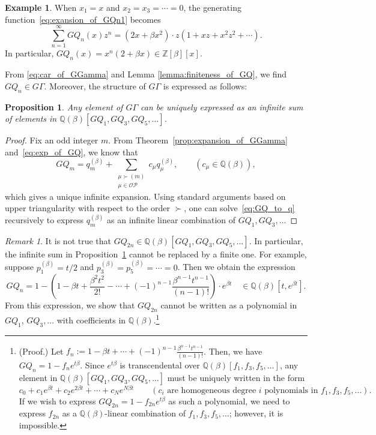 \documentclass[dvipdfmx]{amsart}
\newtheorem{prop}[thm]{Proposition}
\theoremstyle{definition}
\newtheorem{exa}[thm]{Example}%
\theoremstyle{remark}
\newtheorem*{remark}{Remark}%
\def\QQ{\mathord{\mathbb{Q}}}
\begin{document}
\begin{exa}
When \( x_1 = x \) and \( x_2 = x_3 = \cdots = 0 \), the generating function~\eqref{eq:exansion_of_GQn1} becomes
\[
\sum_{n = 1}^\infty GQ_n(x) z^n = 
(2x + \beta x^2) \cdot z(1 + xz + x^2 z^2 + \cdots).
\]
In particular, \( GQ_n(x) = x^n (2 + \beta x) \in \mathbb{Z}[\beta][x] \).
\end{exa}

From \eqref{eq:car_of_GGamma} and Lemma \ref{lemma:finiteness_of_GQ}, we find $GQ_n\in G\Gamma$.
Moreover, the structure of $G\Gamma$ is expressed as follows:

\begin{prop}\label{prop:exp_of_GGamma_in_GQ}
Any element of \( G\Gamma \) can be uniquely expressed as an infinite sum of elements in \( \mathbb{Q}(\beta)[GQ_1, GQ_3, GQ_5, \dots] \).
\end{prop}

\begin{proof}
Fix an odd integer \( m \). From Theorem~\ref{prop:expansion_of_GGamma} and~\eqref{eq:exp_of_GQ}, we know that
\begin{equation}\label{eq:GQ_to_q}
GQ_m = q_m^{(\beta)} + \sum_{\substack{\mu \succ (m) \\ \mu \in \mathcal{OP}}} c_\mu q_\mu^{(\beta)}, \qquad (c_\mu \in \mathbb{Q}(\beta)),
\end{equation}
which gives a unique infinite expansion. Using standard arguments based on upper triangularity with respect to the order \( \succ \), one can solve~\eqref{eq:GQ_to_q} recursively to express \( q_m^{(\beta)} \) as an infinite linear combination of \( GQ_1, GQ_3, \dots \)
\end{proof}

\begin{remark}
It is not true that \( GQ_{2n} \in \mathbb{Q}(\beta)[GQ_1, GQ_3, GQ_5, \dots] \).  
In particular, the infinite sum in Proposition~\ref{prop:exp_of_GGamma_in_GQ} cannot be replaced by a finite one.
For example, suppose \( p_1^{(\beta)} = t/2 \) and \( p_3^{(\beta)} = p_5^{(\beta)} = \cdots = 0 \).  
Then we obtain the expression
\[
GQ_n = 1 -
\left(1 - \beta t + \frac{\beta^2 t^2}{2!} - \cdots + (-1)^{n-1} \frac{\beta^{n-1} t^{n-1}}{(n-1)!} \right)
\cdot e^{\beta t} 
\quad \in \mathbb{Q}(\beta)[t, e^{\beta t}].
\]
From this expression, we show that \( GQ_{2n} \) cannot be written as a polynomial in $ GQ_1$, $GQ_3, \dots $ with coefficients in \( \mathbb{Q}(\beta) \).\footnote{
(Proof.) Let \( f_n := 1 - \beta t + \cdots + (-1)^{n-1} \frac{\beta^{n-1} t^{n-1}}{(n-1)!} \).  
Then, we have $GQ_n=1-f_ne^{t\beta}$.
Since $e^{t\beta}$ is transcendental over $\QQ(\beta)[f_1,f_3,f_5,\dots]$, any element in \( \mathbb{Q}(\beta)[GQ_1, GQ_3, GQ_5, \dots] \) must be uniquely written in the form
\[
c_0 + c_1 e^{\beta t} + c_2 e^{2\beta t} + \cdots + c_N e^{N \beta t}
\qquad
(c_i \text{ are homogeneous degree } i \text{ polynomials in } f_1, f_3, f_5, \dots).
\]
If we wish to express \( GQ_{2n}=1-f_{2n}e^{t\beta} \) as such a polynomial, we need to express \( f_{2n} \) as a \( \mathbb{Q}(\beta) \)-linear combination of \( f_1, f_3, f_5, \dots \); however, it is impossible.
}
\end{remark}
\end{document}
